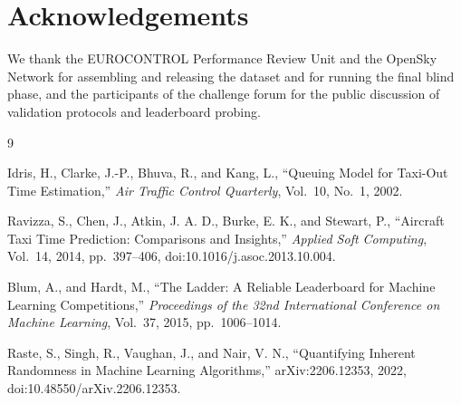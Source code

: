 \documentclass[11pt,a4paper]{article}
\begin{document}
\section*{Acknowledgements}

We thank the EUROCONTROL Performance Review Unit and the OpenSky Network for
assembling and releasing the dataset and for running the final blind phase,
and the participants of the challenge forum for the public discussion of
validation protocols and leaderboard probing.

\begin{thebibliography}{9}

Idris, H., Clarke, J.-P., Bhuva, R., and Kang, L.,
``Queuing Model for Taxi-Out Time Estimation,''
\emph{Air Traffic Control Quarterly}, Vol.~10, No.~1, 2002.

Ravizza, S., Chen, J., Atkin, J. A. D., Burke, E. K., and Stewart, P.,
``Aircraft Taxi Time Prediction: Comparisons and Insights,''
\emph{Applied Soft Computing}, Vol.~14, 2014, pp.~397--406,
doi:10.1016/j.asoc.2013.10.004.

Blum, A., and Hardt, M.,
``The Ladder: A Reliable Leaderboard for Machine Learning Competitions,''
\emph{Proceedings of the 32nd International Conference on Machine Learning},
Vol.~37, 2015, pp.~1006--1014.

Raste, S., Singh, R., Vaughan, J., and Nair, V. N.,
``Quantifying Inherent Randomness in Machine Learning Algorithms,''
arXiv:2206.12353, 2022, doi:10.48550/arXiv.2206.12353.

\end{thebibliography}
\end{document}

